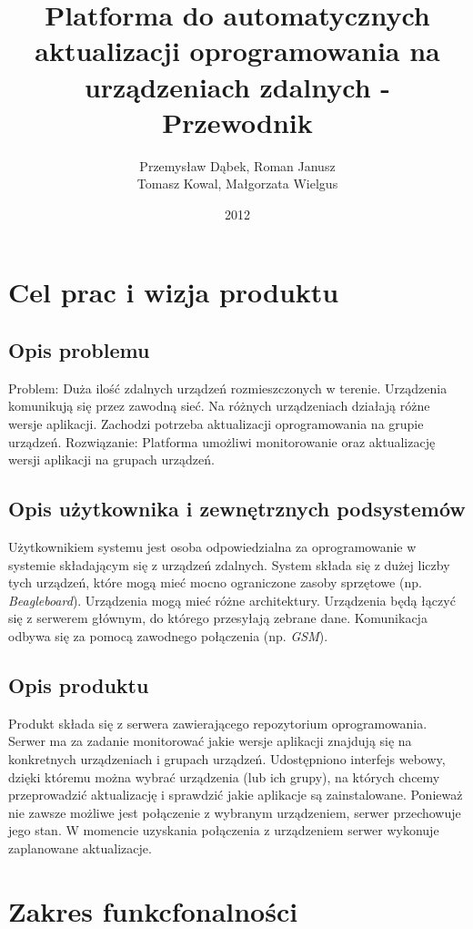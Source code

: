 \documentclass[polish,12pt]{aghthesis}
\author{Przemysław Dąbek, Roman Janusz\\ Tomasz Kowal, Małgorzata Wielgus}
\title{Platforma do automatycznych aktualizacji oprogramowania na urządzeniach zdalnych - Przewodnik}
\date{2012}
\begin{document}
\maketitle

\section{Cel prac i wizja produktu}
\subsection{Opis problemu}
Problem: Duża ilość zdalnych urządzeń rozmieszczonych w terenie. Urządzenia komunikują się przez zawodną sieć. Na różnych urządzeniach działają różne wersje aplikacji. Zachodzi potrzeba aktualizacji oprogramowania na grupie urządzeń. Rozwiązanie: Platforma umożliwi monitorowanie oraz aktualizację wersji aplikacji na grupach urządzeń.

\subsection{Opis użytkownika i zewnętrznych podsystemów}
Użytkownikiem systemu jest osoba odpowiedzialna za oprogramowanie w systemie składającym się z urządzeń zdalnych. System składa się z dużej liczby tych urządzeń, które mogą mieć mocno ograniczone zasoby sprzętowe (np. \emph{Beagleboard}). Urządzenia mogą mieć różne architektury. Urządzenia będą łączyć się z serwerem głównym, do którego przesyłają zebrane dane. Komunikacja odbywa się za pomocą zawodnego połączenia (np. \emph{GSM}).

\subsection{Opis produktu}
Produkt składa się z serwera zawierającego repozytorium oprogramowania. Serwer ma za zadanie monitorować jakie wersje aplikacji znajdują się na konkretnych urządzeniach i grupach urządzeń. Udostępniono interfejs webowy, dzięki któremu można wybrać urządzenia (lub ich grupy), na których chcemy przeprowadzić aktualizację i sprawdzić jakie aplikacje są zainstalowane. Ponieważ nie zawsze możliwe jest połączenie z wybranym urządzeniem, serwer przechowuje jego stan. W momencie uzyskania połączenia z urządzeniem serwer wykonuje zaplanowane aktualizacje.

\section{Zakres funkcfonalności}
\end{document}
